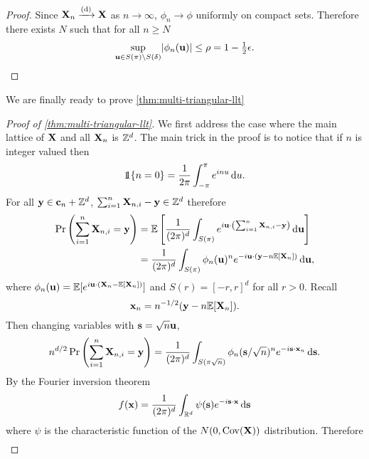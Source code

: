 \begin{proof}
    Since ${\mathbf X}_n \xrightarrow[]{\text{(d)}} {\mathbf X}$ as $n \to \infty$, $\phi_n \to \phi$ uniformly on compact sets. Therefore there exists $N$ such that for all $n \geq N$
    \begin{equation*}
        \sup_{{\mathbf u} \in S(\pi) \setminus S(\delta)} \lvert\phi_n({\mathbf u})\rvert \leq \rho = 1 - \tfrac{1}{2} \epsilon. \qedhere
    \end{equation*}
\end{proof}

We are finally ready to prove \cref{thm:multi-triangular-llt}

\begin{proof}[Proof of \cref{thm:multi-triangular-llt}]
    We first address the case where the main lattice of ${\mathbf X}$ and all ${\mathbf X}_n$ is ${\mathbb Z}^d$. The main trick in the proof is to notice that if $n$ is integer valued then
    \begin{equation*}
        \one\{n = 0\} = \frac{1}{2\pi} \int_{-\pi}^{\pi} e^{i n u} \dif u.
    \end{equation*}
    For all ${\mathbf y} \in {\mathbf c}_n + {\mathbb Z}^d$, $\sum_{i=1}^n {\mathbf X}_{n, i} - {\mathbf y} \in {\mathbb Z}^d$ therefore 
    \begin{align*}
        \Pr\left( \sum_{i=1}^n {\mathbf X}_{n, i} = {\mathbf y} \right)
        &= {\mathbb E}\left[ 
            \frac{1}{(2 \pi)^d} \int_{S(\pi)} e^{i {\mathbf u} \cdot \left(\sum_{i=1}^n {\mathbf X}_{n, i} - {\mathbf y}\right)} \mathop{}\!\mathrm{d} {\mathbf u}
         \right] \\
        &= \frac{1}{(2 \pi)^d} \int_{S(\pi)} \phi_n({\mathbf u})^n e^{-i {\mathbf u} \cdot ({\mathbf y} - n {\mathbb E}[{\mathbf X}_n])} \mathop{}\!\mathrm{d} {\mathbf u},
    \end{align*}
    where $\phi_n({\mathbf u}) = {\mathbb E}[e^{i {\mathbf u} \cdot ({\mathbf X}_n - {\mathbb E}[{\mathbf X}_n])}]$ and $S(r) = [-r, r]^d$ for all $r > 0$. Recall
    \begin{equation*}
        {\mathbf x}_n = n^{-1/2}({\mathbf y} - n {\mathbb E}[{\mathbf X}_n]).
    \end{equation*}
    Then changing variables with ${\mathbf s} = \sqrt{n} {\mathbf u}$,
    \begin{equation*}
        n^{d/2} \Pr\left( \sum_{i=1}^n {\mathbf X}_{n, i} = {\mathbf y} \right)
        = \frac{1}{(2 \pi)^d} \int_{S(\pi\sqrt{n})} \phi_n({\mathbf s}/\sqrt{n})^n e^{-i {\mathbf s} \cdot {\mathbf x}_n} \mathop{}\!\mathrm{d} {\mathbf s}.
    \end{equation*}
    By the Fourier inversion theorem
    \begin{equation*}
        f({\mathbf x}) = \frac{1}{(2 \pi)^d} \int_{{\mathbb R}^d} \psi({\mathbf s}) e^{-i {\mathbf s} \cdot {\mathbf x}} \mathop{}\!\mathrm{d} {\mathbf s}
    \end{equation*}
    where $\psi$ is the characteristic function of the $N(0, \operatorname{Cov}({\mathbf X}))$ distribution. Therefore
    \begin{align*}

\end{align*}
\end{proof}
